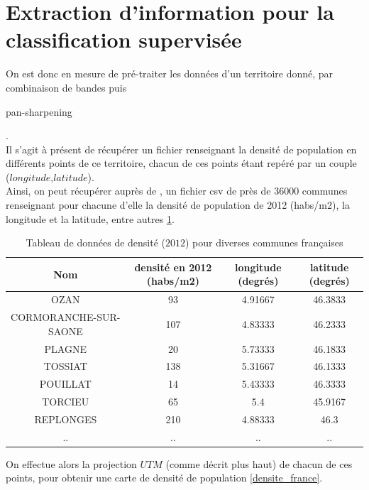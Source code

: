 \documentclass{book}
\begin{document}
\clearpage

\section{Extraction d'information pour la classification supervisée}

On est donc en mesure de pré-traiter les données d'un territoire donné, par combinaison de bandes puis \begin{itshape}pan-sharpening\end{itshape}.\\
Il s'agit à présent de récupérer un fichier renseignant la densité de population en différents points de ce territoire, chacun 
de ces points étant repéré par un couple ($longitude$,$latitude$).\\
Ainsi, on peut récupérer auprès de \cite{sql-data}, un fichier csv de près de 36000 communes renseignant pour chacune d'elle la densité de population de 2012 (habs/m2), la 
longitude et la latitude, entre autres \ref{densite}.

\begin{table}
\begin{center}
\begin{tabular}{|c|c|c|c|}
\hline
Nom&densité en 2012 (habs/m2) &longitude (degrés)&latitude (degrés)\\
\hline
OZAN&93&4.91667&46.3833\\
\hline
CORMORANCHE-SUR-SAONE&107&4.83333&46.2333\\
\hline
PLAGNE&20&5.73333&46.1833\\
\hline
TOSSIAT&138&5.31667&46.1333\\
\hline
POUILLAT&14&5.43333&46.3333\\
\hline
TORCIEU&65&5.4&45.9167\\
\hline
REPLONGES&210&4.88333&46.3\\
\hline
..&..&..&..\\
\hline
\end{tabular}
\end{center}
\caption{Tableau de données de densité ($2012$) pour diverses communes françaises}
\label{densite}
\end{table}

\clearpage

On effectue alors la projection $UTM$ (comme décrit plus haut) de chacun de ces points, pour obtenir une carte de densité de population \ref{densite_france}.
\end{document}
